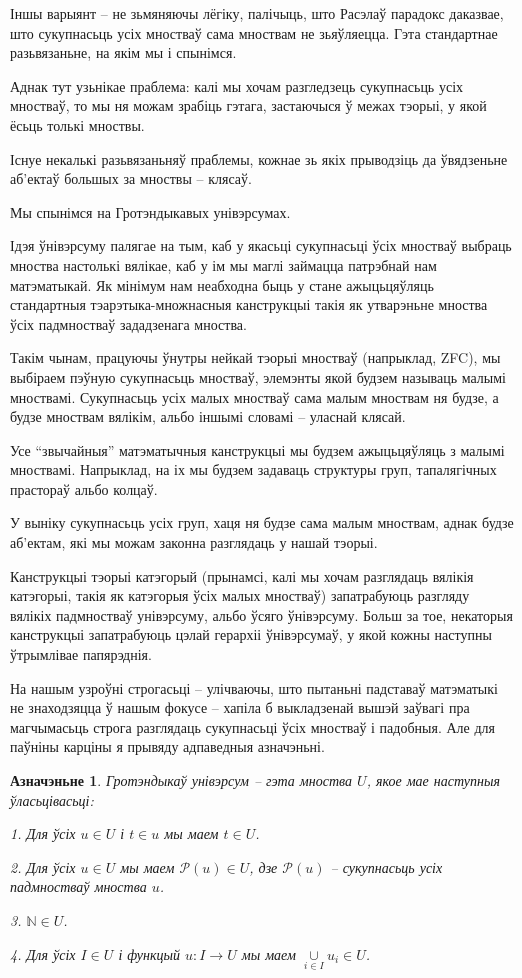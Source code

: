 \documentclass[a4paper,12pt]{book}
\newtheorem{definition}{Азначэньне}[section]
\begin{document}
Іншы варыянт -- не зьмяняючы лёгіку, палічыць, што Расэлаў парадокс
даказвае, што сукупнасьць усіх мностваў сама мноствам не
зьяўляецца. Гэта стандартнае разьвязаньне, на якім мы і спынімся.

Аднак тут узьнікае праблема: калі мы хочам разгледзець сукупнасьць
усіх мностваў, то мы ня можам зрабіць гэтага, застаючыся ў межах
тэорыі, у якой ёсьць толькі мноствы.

Існуе некалькі разьвязаньняў праблемы, кожнае зь якіх прыводзіць да
ўвядзеньне аб'ектаў большых за мноствы -- клясаў.

Мы спынімся на Гротэндыкавых унівэрсумах.

Ідэя ўнівэрсуму палягае на тым, каб у якасьці сукупнасьці ўсіх
мностваў выбраць мноства настолькі вялікае, каб у ім мы маглі займацца
патрэбнай нам матэматыкай. Як мінімум нам неабходна быць у стане
ажыцьцяўляць стандартныя тэарэтыка-множнасныя канструкцыі такія як
утварэньне мноства ўсіх падмностваў зададзенага мноства.

Такім чынам, працуючы ўнутры нейкай тэорыі мностваў (напрыклад, ZFC),
мы выбіраем пэўную сукупнасьць мностваў, элемэнты якой будзем называць
малымі мноствамі. Сукупнасьць усіх малых мностваў сама
малым мноствам ня будзе, а будзе мноствам вялікім, альбо іншымі
словамі -- уласнай клясай.

Усе ``звычайныя'' матэматычныя канструкцыі мы будзем ажыцьцяўляць з
малымі мноствамі. Напрыклад, на іх мы будзем задаваць структуры
груп, тапалягічных прастораў альбо колцаў.

У выніку сукупнасьць усіх груп, хаця ня будзе сама малым мноствам,
аднак будзе аб'ектам, які мы можам законна разглядаць у нашай тэорыі.

Канструкцыі тэорыі катэгорый (прынамсі, калі мы хочам разглядаць
вялікія катэгорыі, такія як катэгорыя ўсіх малых мностваў)
запатрабуюць разгляду вялікіх падмностваў унівэрсуму, альбо ўсяго
ўнівэрсуму. Больш за тое, некаторыя канструкцыі запатрабуюць цэлай
герархіі ўнівэрсумаў, у якой кожны наступны ўтрымлівае папярэднія.

На нашым узроўні строгасьці -- улічваючы, што пытаньні падставаў
матэматыкі не знаходзяцца ў нашым фокусе -- хапіла б выкладзенай вышэй
заўвагі пра магчымасьць строга разглядаць сукупнасьці ўсіх мностваў і
падобныя. Але для паўніны карціны я прывяду адпаведныя азначэньні.


\begin{definition}
  Гротэндыкаў унівэрсум -- гэта мноства $U$, якое мае наступныя
  ўласьцівасьці:

  1. Для ўсіх $u \in U$ і $t \in u$ мы маем $t \in U$.

  2. Для ўсіх $u \in U$ мы маем $\mathcal{P}(u) \in U$, дзе
  $\mathcal{P}(u)$ -- сукупнасьць усіх падмностваў мноства $u$.

  3. $\mathbb{N} \in U$.

  4. Для ўсіх $I \in U$ і функцый $u: I \rightarrow U$ мы маем
  $\underset{i \in I}{\cup}u_i \in U$.
\end{definition}
\end{document}
